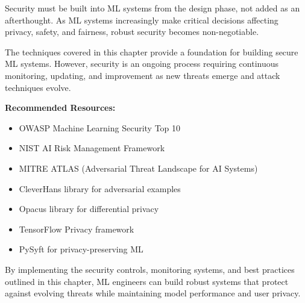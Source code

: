Security must be built into ML systems from the design phase, not added as an afterthought. As ML systems increasingly make critical decisions affecting privacy, safety, and fairness, robust security becomes non-negotiable.

The techniques covered in this chapter provide a foundation for building secure ML systems. However, security is an ongoing process requiring continuous monitoring, updating, and improvement as new threats emerge and attack techniques evolve.

\textbf{Recommended Resources:}
\begin{itemize}
    \item OWASP Machine Learning Security Top 10
    \item NIST AI Risk Management Framework
    \item MITRE ATLAS (Adversarial Threat Landscape for AI Systems)
    \item CleverHans library for adversarial examples
    \item Opacus library for differential privacy
    \item TensorFlow Privacy framework
    \item PySyft for privacy-preserving ML
\end{itemize}

By implementing the security controls, monitoring systems, and best practices outlined in this chapter, ML engineers can build robust systems that protect against evolving threats while maintaining model performance and user privacy.

